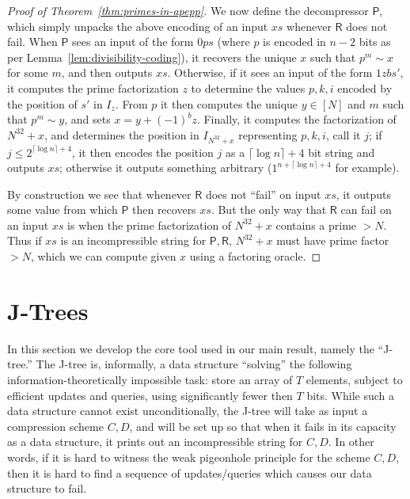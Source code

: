 \documentclass[11pt]{article}
\begin{document}
\begin{proof}[Proof of Theorem~\ref{thm:primes-in-apepp}]
We now define the decompressor $\mathsf{P}$, which simply unpacks the above encoding of an input $xs$ whenever $\mathsf{R}$ does not fail. When $\mathsf{P}$ sees an input of the form $0ps$ (where $p$ is encoded in $n-2$ bits as per Lemma~\ref{lem:divisibility-coding}), it recovers the unique $x$ such that $p^m \sim x$ for some $m$, and then outputs $xs$. Otherwise, if it sees an input of the form $1zbs'$, it computes the prime factorization $z$ to determine the values $p,k,i$ encoded by the position of $s'$ in $I_z$. From $p$ it then computes the unique $y \in [N]$ and $m$ such that $p^m \sim y$, and sets $x = y + (-1)^b z$. Finally, it computes the factorization of $N^{32} + x$, and determines the position in $I_{N^{32} + x}$ representing $p,k,i$, call it $j$; if $j \leq 2^{\lceil \log n \rceil + 4}$, it then encodes the position $j$ as a $\lceil \log n \rceil + 4$ bit string and outputs $xs$; otherwise it outputs something arbitrary ($1^{n + \lceil \log n \rceil + 4}$ for example).

By construction we see that whenever $\mathsf{R}$ does not ``fail'' on input $xs$, it outputs some value from which $\mathsf{P}$ then recovers $xs$. But the only way that $\mathsf{R}$ can fail on an input $xs$ is when the prime factorization of $N^{32} + x$ contains a prime $> N$. Thus if $xs$ is an incompressible string for $\mathsf{P},\mathsf{R}$, $N^{32} +x$ must have prime factor $> N$, which we can compute given $x$ using a factoring oracle.
\end{proof}
\section{J-Trees}\label{sec:j-trees}
In this section we develop the core tool used in our main result, namely the ``J-tree.'' The J-tree is, informally, a data structure ``solving'' the following information-theoretically impossible task: store an array of $T$ elements, subject to efficient updates and queries, using significantly fewer then $T$ bits. While such a data structure cannot exist unconditionally, the J-tree will take as input a compression scheme $C,D$, and will be set up so that when it fails in its capacity as a data structure, it prints out an incompressible string for $C,D$. In other words, if it is hard to witness the weak pigeonhole principle for the scheme $C,D$, then it is hard to find a sequence of updates/queries which causes our data structure to fail.
\end{document}
